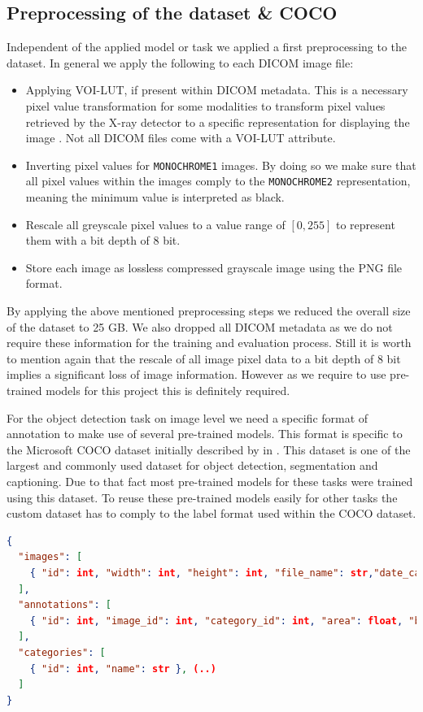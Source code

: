 \subsection*{Preprocessing of the dataset \& COCO}
Independent of the applied model or task we applied a first preprocessing to the dataset. In general we apply the following to each DICOM image file:
\begin{itemize}
	\item Applying VOI-LUT, if present within DICOM metadata. This is a necessary pixel value transformation for some modalities to transform pixel values retrieved by the X-ray detector to a specific representation for displaying the image \autocite{dicom2018}. Not all DICOM files come with a VOI-LUT attribute.
	\item Inverting pixel values for \texttt{MONOCHROME1} images. By doing so we make sure that all pixel values within the images comply to the \texttt{MONOCHROME2} representation, meaning the minimum value is interpreted as black.
	\item Rescale all greyscale pixel values to a value range of $[0,255]$ to represent them with a bit depth of 8 bit.
	\item Store each image as lossless compressed grayscale image using the \ac{PNG} file format.
\end{itemize}

By applying the above mentioned preprocessing steps we reduced the overall size of the dataset to 25 GB. We also dropped all DICOM metadata as we do not require these information for the training and evaluation process. Still it is worth to mention again that the rescale of all image pixel data to a bit depth of 8 bit implies a significant loss of image information. However as we require to use pre-trained models for this project this is definitely required.

For the object detection task on image level we need a specific format of annotation to make use of several pre-trained models. This format is specific to the Microsoft \ac{COCO} dataset initially described by \citeauthor{lin_microsoft_2015} in \citeyear{lin_microsoft_2015}. This dataset is one of the largest and commonly used dataset for object detection, segmentation and captioning. Due to that fact most pre-trained models for these tasks were trained using this dataset. To reuse these pre-trained models easily for other tasks the custom dataset has to comply to the label format used within the \ac{COCO} dataset.

\begin{minipage}{\linewidth}
	\begin{lstlisting}[language=json,firstnumber=1, caption={Basic COCO annotation format in \autocite{lin_microsoft_2015}.}, captionpos=b, label={lst:coco-sample}]
{
  "images": [
    { "id": int, "width": int, "height": int, "file_name": str,"date_captured": datetime }, (..)
  ], 
  "annotations": [
    { "id": int, "image_id": int, "category_id": int, "area": float, "bbox": [x,y,width,height] }, (..)
  ],
  "categories": [
    { "id": int, "name": str }, (..)
  ]
}
	\end{lstlisting}
\end{minipage}

